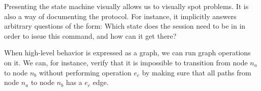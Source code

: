 Presenting the state machine visually allows us to visually spot problems. It is also a way of documenting the protocol. For instance, it implicitly answers arbitrary questions of the form: Which state does the session need to be in in order to issue this command, and how can it get there?

When high-level behavior is expressed as a graph, we can run graph operations on it. We can, for instance, verify that it is impossible to transition from node $n_a$ to node $n_b$ without performing operation $e_c$ by making sure that all paths from node $n_a$ to node $n_b$ has a $e_c$ edge.


